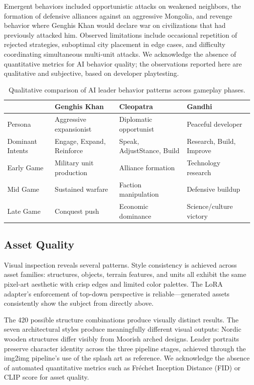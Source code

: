 \documentclass[conference]{IEEEtran}
\begin{document}
Emergent behaviors included opportunistic attacks on weakened neighbors,
the formation of defensive alliances against an aggressive Mongolia, and
revenge behavior where Genghis Khan would declare war on civilizations that
had previously attacked him. Observed limitations include occasional
repetition of rejected strategies, suboptimal city placement in edge cases,
and difficulty coordinating simultaneous multi-unit attacks. We acknowledge
the absence of quantitative metrics for AI behavior quality; the
observations reported here are qualitative and subjective, based on
developer playtesting.
\begin{table}[htb]
\centering
\caption{Qualitative comparison of AI leader behavior patterns across gameplay phases.}
\label{tab:ai-behavior}
\begin{tabular}{p{}p{}p{}p{}}
\toprule
& \textbf{Genghis Khan} & \textbf{Cleopatra} & \textbf{Gandhi} \\
\midrule
Persona & Aggressive expansionist & Diplomatic opportunist & Peaceful developer \\
Dominant Intents & Engage, Expand, Reinforce & Speak, AdjustStance, Build & Research, Build, Improve \\
Early Game & Military unit production & Alliance formation & Technology research \\
Mid Game & Sustained warfare & Faction manipulation & Defensive buildup \\
Late Game & Conquest push & Economic dominance & Science/culture victory \\
\bottomrule
\end{tabular}
\end{table}

\subsection{Asset Quality}

Visual inspection reveals several patterns. Style consistency is achieved
across asset families: structures, objects, terrain features, and units all
exhibit the same pixel-art aesthetic with crisp edges and limited color
palettes. The LoRA adapter's enforcement of top-down perspective is
reliable---generated assets consistently show the subject from directly
above.

The 420 possible structure combinations produce visually distinct results.
The seven architectural styles produce meaningfully different visual
outputs: Nordic wooden structures differ visibly from Moorish arched
designs. Leader portraits preserve character identity across the three
pipeline stages, achieved through the img2img pipeline's use of the splash
art as reference. We acknowledge the absence of automated quantitative
metrics such as Fr\'{e}chet Inception Distance (FID) or CLIP score for
asset quality.
\end{document}
